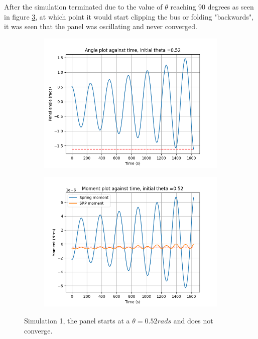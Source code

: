 After the simulation terminated due to the value of $\theta$ reaching 90 degrees as seen in figure \ref{fig:1_results}, at which point it would start clipping the bus or folding "backwards", it was seen that the panel was oscillating and never converged. 

\begin{figure}[!htb]
\centering
\begin{subfigure}{0.5\textwidth}
  \centering
  \includegraphics[width=1\linewidth]{images/first/theta_plot.png}
  \label{fig:1_theta}
\end{subfigure}%
\begin{subfigure}{.5\textwidth}
  \centering
  \includegraphics[width=1\linewidth]{images/first/moment_plot.png}
  \label{fig:1_moment}
\end{subfigure}
\caption{Simulation 1, the panel starts at a $\theta = 0.52 rads$ and does not converge.}
\label{fig:1_results}
\end{figure}



